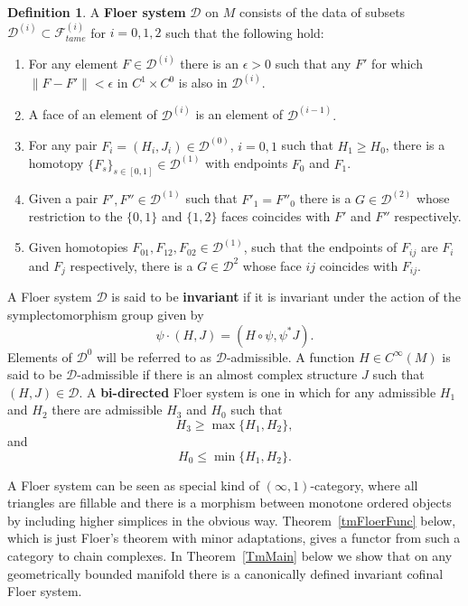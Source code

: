 \documentclass[11pt]{amsart}
\theoremstyle{definition}
\newtheorem{df}[tm]{Definition}
\theoremstyle{remark}
\begin{document}
 \begin{df}\label{dfFloerSys}
 A \textbf{Floer system} $\mathcal{D}$ on $M$ consists of the data of subsets $\mathcal{D}^{(i)}\subset\mathcal{F}^{(i)}_{tame}$ for $i=0,1,2$ such that the following hold:
 \begin{enumerate}
 \item\label{dfFloerSys:it0} For any element $F\in\mathcal{D}^{(i)}$ there is an $\epsilon>0$ such that any $F'$ for which $\|F-F'\|<\epsilon$ in $C^1\times C^0$ is also in $\mathcal{D}^{(i)}$.
 \item\label{dfFloerSys:it1} A face of an element of $\mathcal{D}^{(i)}$ is an element of $\mathcal{D}^{(i-1)}.$
 \item\label{dfFloerSys:it2} For any pair $F_i=(H_i,J_i)\in\mathcal{D}^{(0)}$, $i=0,1$ such that $H_1\geq H_0$, there is a homotopy $\{F_s\}_{s\in[0,1]}\in\mathcal{D}^{(1)}$ with endpoints $F_0$ and $F_1$.
 \item\label{dfFloerSys:it3} Given a pair $F',F''\in\mathcal{D}^{(1)}$ such that $F'_1=F''_0$ there is a $G\in\mathcal{D}^{(2)}$ whose restriction to the $\{0,1\}$ and $\{1,2\}$ faces coincides with $F'$ and $F''$ respectively.
 \item\label{dfFloerSys:it4} Given homotopies $F_{01},F_{12},F_{02}\in\mathcal{D}^{(1)}$, such that the endpoints of $F_{ij}$ are $F_i$ and $F_j$ respectively, there is a $G\in\mathcal{D}^2$ whose face $ij$  coincides with  $F_{ij}$.
 \end{enumerate}
  A Floer  system $\mathcal{D}$ is said to be \textbf{invariant} if it is invariant under the action of the symplectomorphism group given by
  \[
    \psi\cdot(H,J)=(H\circ \psi,\psi^*J).
  \]
  Elements of $\mathcal{D}^0$ will be referred to as $\mathcal{D}$-admissible. A function $H\in C^{\infty}(M)$ is said to be $\mathcal{D}$-admissible if there is an almost complex structure $J$ such that $(H,J)\in\mathcal{D}$.
  A \textbf{bi-directed} Floer system is one in which for any admissible $H_1$ and $H_2$  there are admissible $H_3$ and $H_0$ such that
        \[
        H_3\geq\max\{H_1,H_2\},
        \]
  and
  \[
  H_0\leq\min\{H_1,H_2\}.
  \]
\end{df}
A Floer system can be seen as special kind of $(\infty,1)$-category, where all triangles are fillable and there is a morphism between monotone ordered objects by including higher simplices in the obvious way. Theorem~\ref{tmFloerFunc} below, which is just Floer's theorem\cite{Floer1989} with minor adaptations, gives a functor from such a category to chain complexes. In Theorem~\ref{TmMain} below we show that on any geometrically bounded manifold there is a canonically defined invariant cofinal Floer system.
\end{document}
